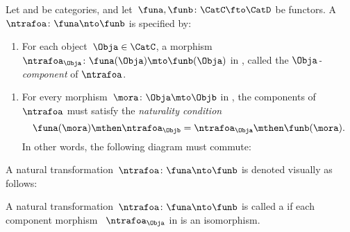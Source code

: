 \begin{ctdefinition}
	\label{def:natural-transformation}
	Let \CatC and \CatD be categories, and let~$\funa,\funb\colon \CatC\fto \CatD$ be functors.
	A \emph{}~$\ntrafoa \colon \funa\nto \funb$ is specified by:

	\constit
	\begin{enumerate}
		\item For each object~$\Obja\in \CatC$, a morphism $\ntrafoa_\Obja \colon \funa(\Obja)\mto \funb(\Obja)$ in \CatD, called the $\Obja$\emph{-component} of $\ntrafoa$.
	\end{enumerate}
	\condit
	\begin{enumerate}
		\item For every morphism~$\mora\colon \Obja\mto \Objb$ in \CatC, the components of $\ntrafoa$ must satisfy the \emph{naturality condition}
		      \begin{equation}
			      \funa(\mora)\mthen \ntrafoa_\Objb = \ntrafoa_\Obja\mthen \funb(\mora).
		      \end{equation}
		      In other words, the following diagram must commute:
		      \begin{center}
		      \end{center}
	\end{enumerate}
	A natural transformation~$\ntrafoa \colon \funa\nto \funb$ is denoted visually as follows:
	\begin{center}
	\end{center}
\end{ctdefinition}

\begin{figure}[h!
    ]
    \centering
    \caption{}
    \label{fig:nat_trans_graphically}
\end{figure}

\begin{ctdefinition}
	\label{def:nat_iso}
	A natural transformation~$\ntrafoa \colon \funa \nto \funb $ is called a \emph{} if each component morphism ~$\ntrafoa_\Obja$ in \CatD is an isomorphism.
\end{ctdefinition}


